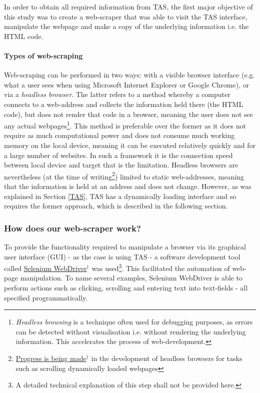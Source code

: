\documentclass{article}
\begin{document}
In order to obtain all required information from TAS, the first major objective of this study was to create a web-scraper that was able to visit the TAS interface, manipulate the webpage and make a copy of the underlying information i.e. the HTML code.


\paragraph{Types of web-scraping}
\label{sec-3-3-1-1}

Web-scraping can be performed in two ways: with a visible browser interface (e.g. what a user sees when using Microsoft Internet Explorer or Google Chrome), or via a \emph{headless browser}. The latter refers to a method whereby a computer connects to a web-address and collects the information held there (the HTML code), but does not render that code in a browser, meaning the user does not see any actual webpages\footnote{\emph{Headless browsing} is a technique often used for debugging purposes, as errors can be detected without visualisation i.e. without rendering the underlying information. This accelerates the process of web-development.}. This method is preferable over the former as it does not require as much computational power and does not consume much working memory on the local device, meaning it can be executed relatively quickly and for a large number of websites. In such a framework it is the connection speed between local device and target that is the limitation. Headless browsers are nevertheless (at the time of writing\footnote{\href{http://stackoverflow.com/questions/34942103/headless-endless-scroll-selenium}{Progress is being made$^{\dag{}}$} in the development of headless browsers for tasks such as scrolling dynamically loaded webpages}) limited to static web-addresses, meaning that the information is held at an address and does not change. However, as was explained in Section \ref{TAS}, TAS has a dynamically loading interface and so requires the former approach, which is described in the following section.


\subsubsection{How does our web-scraper work?}
\label{sec-3-3-2}

To provide the functionality required to manipulate a browser via its graphical user interface (GUI) - as the case is using TAS - a software development tool called \href{http://docs.seleniumhq.org/}{Selenium WebDriver$^{\dag{}}$} was used\footnote{A detailed technical explanation of this step shall not be provided here.}. This facilitated the automation of web-page manipulation. To name several examples, Selenium WebDriver is able to perform actions such as clicking, scrolling and entering text into text-fields - all specified programmatically.
\end{document}
